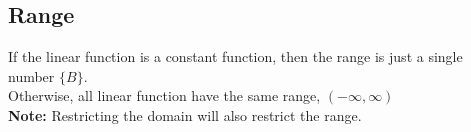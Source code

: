 \documentclass{ximera}
\begin{document}
\subsection*{Range}


If the linear function is a constant function, then the range is just a single number $\{ B \}$. \\

Otherwise, all linear function have the same range, $(-\infty, \infty)$ \\

\textbf{Note:} Restricting the domain will also restrict the range.\\
\end{document}
